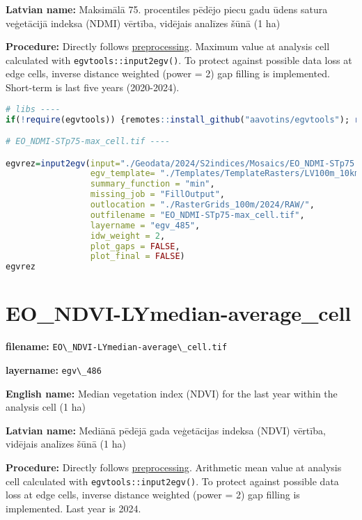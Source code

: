 \documentclass[
]{book}
\newcommand{\passthrough}[1]{#1}
\begin{document}
\textbf{Latvian name:} Maksimālā 75. procentiles pēdējo piecu gadu ūdens satura veģetācijā indeksa (NDMI) vērtība, vidējais analīzes šūnā (1 ha)

\textbf{Procedure:} Directly follows \hyperref[Ch04.13]{preprocessing}. Maximum value at analysis cell
calculated with \passthrough{\lstinline!egvtools::input2egv()!}. To protect against possible data loss at edge cells,
inverse distance weighted (power = 2) gap filling is implemented. Short-term is last five years (2020-2024).

\begin{lstlisting}[language=R]
# libs ----
if(!require(egvtools)) {remotes::install_github("aavotins/egvtools"); require(egvtools)}

# EO_NDMI-STp75-max_cell.tif ----

egvrez=input2egv(input="./Geodata/2024/S2indices/Mosaics/EO_NDMI-STp75.tif",
                 egv_template= "./Templates/TemplateRasters/LV100m_10km.tif",
                 summary_function = "min",
                 missing_job = "FillOutput",
                 outlocation = "./RasterGrids_100m/2024/RAW/",
                 outfilename = "EO_NDMI-STp75-max_cell.tif",
                 layername = "egv_485",
                 idw_weight = 2,
                 plot_gaps = FALSE,
                 plot_final = FALSE)
egvrez
\end{lstlisting}

\section{EO\_NDVI-LYmedian-average\_cell}\label{ch06.486}

\textbf{filename:} \passthrough{\lstinline!EO\_NDVI-LYmedian-average\_cell.tif!}

\textbf{layername:} \passthrough{\lstinline!egv\_486!}

\textbf{English name:} Median vegetation index (NDVI) for the last year within the analysis cell (1 ha)

\textbf{Latvian name:} Mediānā pēdējā gada veģetācijas indeksa (NDVI) vērtība, vidējais analīzes šūnā (1 ha)

\textbf{Procedure:} Directly follows \hyperref[Ch04.13]{preprocessing}. Arithmetic mean value at analysis cell
calculated with \passthrough{\lstinline!egvtools::input2egv()!}. To protect against possible data loss at edge cells,
inverse distance weighted (power = 2) gap filling is implemented. Last year is 2024.
\end{document}
